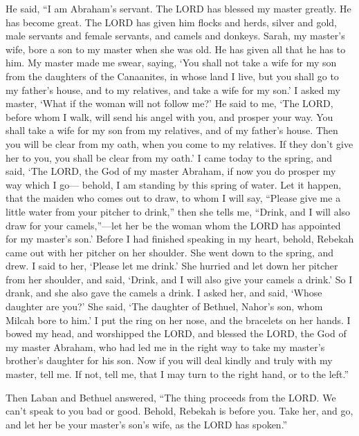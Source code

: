  He said, ``I am Abraham's servant.  The LORD
has blessed my master greatly. He has become great. The LORD has given
him flocks and herds, silver and gold, male servants and female
servants, and camels and donkeys.  Sarah, my master's wife,
bore a son to my master when she was old. He has given all that he has
to him.  My master made me swear, saying, `You shall not
take a wife for my son from the daughters of the Canaanites, in whose
land I live,  but you shall go to my father's house, and to
my relatives, and take a wife for my son.'  I asked my
master, `What if the woman will not follow me?'  He said to
me, `The LORD, before whom I walk, will send his angel with you, and
prosper your way. You shall take a wife for my son from my relatives,
and of my father's house.  Then you will be clear from my
oath, when you come to my relatives. If they don't give her to you, you
shall be clear from my oath.'  I came today to the spring,
and said, `The LORD, the God of my master Abraham, if now you do prosper
my way which I go---  behold, I am standing by this spring
of water. Let it happen, that the maiden who comes out to draw, to whom
I will say, ``Please give me a little water from your pitcher to
drink,''  then she tells me, ``Drink, and I will also draw
for your camels,''---let her be the woman whom the LORD has appointed
for my master's son.'  Before I had finished speaking in my
heart, behold, Rebekah came out with her pitcher on her shoulder. She
went down to the spring, and drew. I said to her, `Please let me drink.'
 She hurried and let down her pitcher from her shoulder,
and said, `Drink, and I will also give your camels a drink.' So I drank,
and she also gave the camels a drink.  I asked her, and
said, `Whose daughter are you?' She said, `The daughter of Bethuel,
Nahor's son, whom Milcah bore to him.' I put the ring on her nose, and
the bracelets on her hands.  I bowed my head, and
worshipped the LORD, and blessed the LORD, the God of my master Abraham,
who had led me in the right way to take my master's brother's daughter
for his son.  Now if you will deal kindly and truly with my
master, tell me. If not, tell me, that I may turn to the right hand, or
to the left.''

 Then Laban and Bethuel answered, ``The thing proceeds from
the LORD. We can't speak to you bad or good.  Behold,
Rebekah is before you. Take her, and go, and let her be your master's
son's wife, as the LORD has spoken.''

